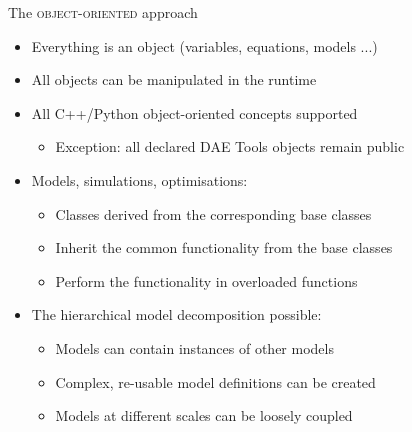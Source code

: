 \documentclass[compress,newPxFont,sthlmFooter]{beamer}
\begin{document}
\begin{frame}{The \textsc{object-oriented} approach}
\begin{itemize}
  \item Everything is an \alert{object} (variables, equations, models ...)
  \item All objects can be \alert{manipulated} in \alert{the runtime}
  \item \alert{All} C++/Python \alert{object-oriented concepts supported}
      \begin{itemize}
          \item \alert{Exception}: all declared DAE Tools objects \alert{remain public}
      \end{itemize}
  \item Models, simulations, optimisations:
     \begin{itemize}
        \item Classes \alert{derived from} the corresponding \alert{base classes}
        \item \alert{Inherit} the \alert{common functionality} from the base classes
        \item Perform the \alert{functionality} in \alert{overloaded functions}
     \end{itemize}
  \item The \alert{hierarchical model decomposition} possible:
    \begin{itemize}
        \item Models can contain instances of other models
        \item Complex, re-usable model definitions can be created
        \item Models at different scales can be loosely coupled %
    \end{itemize}
\end{itemize}
\end{frame}
\end{document}
